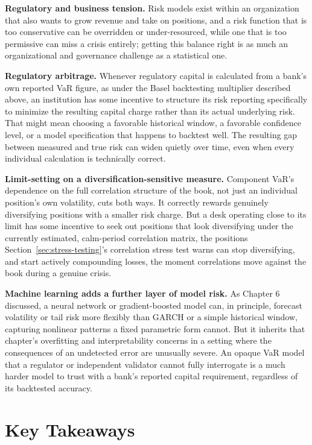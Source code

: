 \documentclass[../ai_in_finance]{subfiles}
\begin{document}
\textbf{Regulatory and business tension.} Risk models exist within an organization that also wants to grow revenue and take on positions, and a risk function that is too conservative can be overridden or under-resourced, while one that is too permissive can miss a crisis entirely; getting this balance right is as much an organizational and governance challenge as a statistical one.

\textbf{Regulatory arbitrage.} Whenever regulatory capital is calculated from a bank's own reported VaR figure, as under the Basel backtesting multiplier described above, an institution has some incentive to structure its risk reporting specifically to minimize the resulting capital charge rather than its actual underlying risk. That might mean choosing a favorable historical window, a favorable confidence level, or a model specification that happens to backtest well. The resulting gap between measured and true risk can widen quietly over time, even when every individual calculation is technically correct.

\textbf{Limit-setting on a diversification-sensitive measure.} Component VaR's dependence on the full correlation structure of the book, not just an individual position's own volatility, cuts both ways. It correctly rewards genuinely diversifying positions with a smaller risk charge. But a desk operating close to its limit has some incentive to seek out positions that look diversifying under the currently estimated, calm-period correlation matrix, the positions Section~\ref{sec:stress-testing}'s correlation stress test warns can stop diversifying, and start actively compounding losses, the moment correlations move against the book during a genuine crisis.

\textbf{Machine learning adds a further layer of model risk.} As Chapter 6 discussed, a neural network or gradient-boosted model can, in principle, forecast volatility or tail risk more flexibly than GARCH or a simple historical window, capturing nonlinear patterns a fixed parametric form cannot. But it inherits that chapter's overfitting and interpretability concerns in a setting where the consequences of an undetected error are unusually severe. An opaque VaR model that a regulator or independent validator cannot fully interrogate is a much harder model to trust with a bank's reported capital requirement, regardless of its backtested accuracy.

\section{Key Takeaways}
\end{document}
